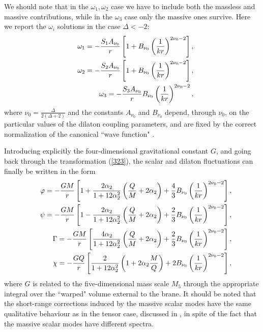 \documentclass[a4paper,12pt]{article}
\begin{document}
We should note that in the $\omega_1, \omega_2$ case we have to
include both the massless and massive contributions, while in the
$\omega_3$ case only the massive ones survive. Here we report the
$\omega_i$ solutions in the case $\Delta<-2$:
\begin{eqnarray} && \omega_1=-{S_1 A_{\nu_0}\over r} \left[1+
B_{\nu_0}\left(1\over kr\right)^{2\nu_0-2}\right], \nonumber\\ &&
\omega_2=-{S_2 A_{\nu_0}\over r} \left[1+ B_{\nu_0}\left(1\over
kr\right)^{2\nu_0-2}\right], \nonumber\\ && \omega_3=-{S_3
A_{\nu_0}\over r} B_{\nu_0}\left(1\over kr\right)^{2\nu_0-2} ,
\label{610}
\end{eqnarray}
where $\nu_0=\frac{\Delta}{2(\Delta+2)}$ and the constants
$A_{\nu_0}$ and $B_{\nu_0}$ depend, through
$\nu_0$,  on the particular values of the dilaton coupling parameters,
and are fixed by the correct normalization of the canonical ``wave
function" \cite{BGV}.

Introducing explicitly the four-dimensional gravitational constant
$G$, and going back through the transformation (\ref{323}), the
scalar and dilaton fluctuations can finally be written in the form
\begin{eqnarray} && \varphi =-{GM\over r}\left[1+ {2 \alpha_2\over
1+12 \alpha_2^2} \left({Q\over M} + 2 \alpha_2\right) + {4\over
3}B_{\nu_0} \left(1\over kr\right)^{2\nu_0-2}\right], \nonumber\\
&& \psi =-{GM\over r}\left[1-{2 \alpha_2\over 1+12 \alpha_2^2}
\left({Q\over M} + 2 \alpha_2\right) + {2\over 3}B_{\nu_0}
\left(1\over kr\right)^{2\nu_0-2}\right], \nonumber\\ && \Gamma
=-{GM\over r}\left[{4 \alpha_2\over 1+12 \alpha_2^2} \left({Q\over
M} + 2 \alpha_2\right) + {2\over 3}B_{\nu_0} \left(1\over
kr\right)^{2\nu_0-2}\right], \nonumber\\ && \chi =-{GQ\over
r}\left[{2 \over 1+12 \alpha_2^2} \left(1+ 2\alpha_2 {M\over
Q}\right) + {2}B_{\nu_0} \left(1\over kr\right)^{2\nu_0-2}\right],
\label{616}
\end{eqnarray}
where $G$ is related to
the five-dimensional mass scale $M_5$ through the appropriate
integral over the ``warped" volume external to the brane.  It should be
noted that the short-range corrections induced by the massive scalar
modes have the same qualitative behaviour as in the tensor case,
discussed in \cite{CLP}, in spite of the fact that the massive scalar
modes have different spectra.
\end{document}
